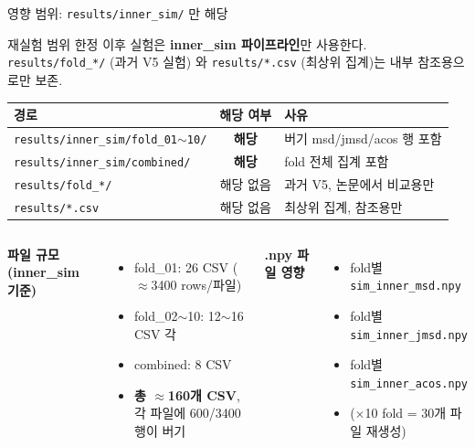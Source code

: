 \documentclass[aspectratio=169,10pt]{beamer}
\begin{document}
\begin{frame}{영향 범위: \texttt{results/inner\_sim/} 만 해당}
	\begin{block}{재실험 범위 한정}
		이후 실험은 \textbf{inner\_sim 파이프라인}만 사용한다.\\
		\texttt{results/fold\_*/} (과거 V5 실험) 와 \texttt{results/*.csv} (최상위 집계)는 내부 참조용으로만 보존.
	\end{block}

	\vspace{0.3em}
	\renewcommand{\arraystretch}{1.3}
	\begin{tabular}{l|c|l}
		\toprule
		\textbf{경로} & \textbf{해당 여부} & \textbf{사유} \\
		\midrule
		\texttt{results/inner\_sim/fold\_01$\sim$10/} & \textcolor{negred}{\textbf{해당}} & 버기 msd/jmsd/acos 행 포함 \\
		\texttt{results/inner\_sim/combined/}         & \textcolor{negred}{\textbf{해당}} & fold 전체 집계 포함 \\
		\texttt{results/fold\_*/}                     & \textcolor{testgreen}{해당 없음} & 과거 V5, 논문에서 비교용만 \\
		\texttt{results/*.csv}                        & \textcolor{testgreen}{해당 없음} & 최상위 집계, 참조용만 \\
		\bottomrule
	\end{tabular}

	\vspace{0.3em}
	\begin{columns}[T]
			\textbf{파일 규모 (inner\_sim 기준)}
			\begin{itemize}
				\item fold\_01: 26 CSV ($\approx$3400 rows/파일)
				\item fold\_02$\sim$10: 12$\sim$16 CSV 각
				\item combined: 8 CSV
				\item \textbf{총 $\approx$160개 CSV},\\
					각 파일에 600/3400 행이 버기
			\end{itemize}

			\textbf{.npy 파일 영향}
			\begin{itemize}
				\item fold별 \texttt{sim\_inner\_msd.npy}
				\item fold별 \texttt{sim\_inner\_jmsd.npy}
				\item fold별 \texttt{sim\_inner\_acos.npy}
				\item ($\times$10 fold = 30개 파일 재생성)
			\end{itemize}
	\end{columns}
\end{frame}
\end{document}
